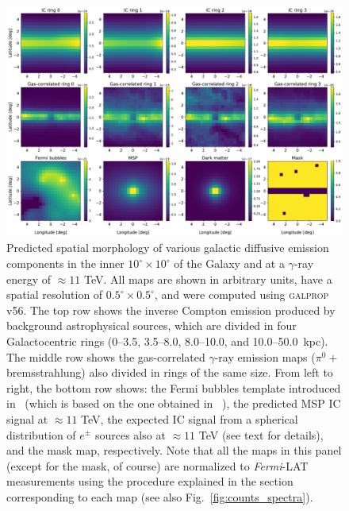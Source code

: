 \documentclass[doublespace,nopageskip]{VTthesis} %
\begin{document}
\begin{figure}
    \begin{center}
    \includegraphics[scale = 0.45]{Figures/CTA/maps_orig.pdf}
    \caption{Predicted spatial morphology of various galactic diffusive emission components in the inner $10^\circ \times 10^\circ$ of the Galaxy and at a $\gamma$-ray energy of $\approx 11$ TeV. All maps  
    are shown in arbitrary units, have a spatial resolution of $0.5^\circ \times 0.5^\circ$, and were computed using \textsc{galprop} v56. The top row shows the inverse Compton emission produced by background astrophysical sources, which are divided in four Galactocentric rings (0--3.5, 3.5--8.0, 8.0--10.0, and 10.0--50.0~kpc). The middle row shows the gas-correlated $\gamma$-ray emission maps ($\pi^0+$bremsstrahlung) also divided in rings of the same size. From left to right, the bottom row shows: the Fermi bubbles template introduced in~\citet{Macias:2019omb} (which is based on the one obtained in ~\citet{Fermi-bubbles:2014sfa}), the predicted MSP IC signal at $\approx 11$ TeV, the expected IC signal from a spherical distribution of $e^{\pm}$ sources also at $\approx 11$ TeV 
    (see text for details), and the mask map, respectively. Note that all the maps in this panel (except for the mask, of course) are normalized to \textit{Fermi}-LAT measurements using the procedure explained in the section corresponding to each map (see also Fig.~\ref{fig:counts_spectra}).}
    \label{fig:galpropmaps}
    \end{center}
\end{figure}
\end{document}
